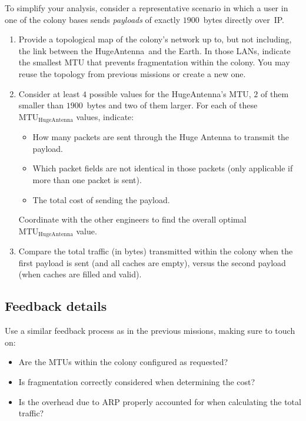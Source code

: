 \noindent
To simplify your analysis, consider a representative scenario in which a user in one of the colony bases sends
\textit{payloads} of exactly $1900$~bytes directly over~IP.

\begin{enumerate}[itemsep=0.1cm]
\item Provide a topological map of the colony's network up to, but not including, the link between the HugeAntenna\texttrademark\  and the Earth. In those LANs, indicate the smallest MTU that prevents fragmentation within the colony.
You may reuse the topology from previous missions or create a new one.

\item Consider at least $4$ possible values for the HugeAntenna's MTU, $2$ of them smaller than $1900$~bytes and two of them larger. For each of these $\textrm{MTU}_\textrm{HugeAntenna}$ values, indicate:
  \begin{itemize}
  \item How many packets are sent through the Huge Antenna to transmit the payload.
  \item Which packet fields are not identical in those packets (only applicable if more than one packet is sent).
  \item The total cost of sending the payload.
  \end{itemize}
Coordinate with the other engineers to find the overall optimal $\textrm{MTU}_\textrm{HugeAntenna}$ value.

\item Compare the total traffic (in bytes) transmitted within the colony when the first payload is sent (and all caches are empty), versus the second payload (when caches are filled and valid).
\end{enumerate}


\subsection*{Feedback details}

Use a similar feedback process as in the previous missions, making sure to touch on:
\begin{itemize}
\item Are the MTUs within the colony configured as requested?
\item Is fragmentation correctly considered when determining the cost?
\item Is the overhead due to ARP properly accounted for when calculating the total traffic?
\end{itemize}
